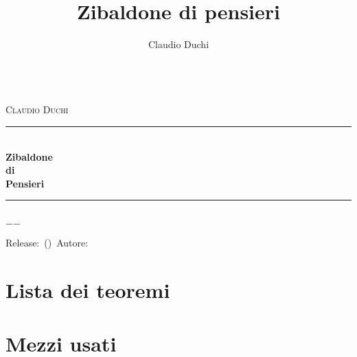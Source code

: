 \documentclass[a4paper,oneside]{book}%
\title{Zibaldone di pensieri}
\author{Claudio Duchi}
\date{\datetime}
\makeatletter
\theoremstyle{marginbreak}
\theoremstyle{marginbreak}
\theoremstyle{changebreak}
\theoremstyle{change}
\theoremstyle{change}
\theoremstyle{plain}
\theoremstyle{marginbreak}
\theoremstyle{plain}
\theoremstyle{plain}
\theoremstyle{nonumberplain}
\theoremstyle{marginbreak}
\newcommand{\HRule}{\rule{\linewidth}{0.5mm}}
\renewcommand\mainmatter{%
 	\cleardoublepage
 	\@mainmattertrue
 }
\makeatother
\begin{document}
\begin{titlepage}
\begin{center}	
	\Lgrandedue\\[1cm]    
	\textsc{\LARGE Claudio Duchi}\\[1.4cm]
	\HRule \\[0.4cm]
{ \huge \bfseries Zibaldone}\\[0.4cm]
{ \large \bfseries di}\\[0.4cm]
{ \huge \bfseries Pensieri}\\[0.4cm]
\HRule \\
\vfill
		{\large $-$\DTMnow$-$}	
\end{center}
{\centering
Release:\gitReln\ (\gitAbbrevHash)\ Autore:\gitAuthorName\ 
\gitCommitterDate \\
}
\end{titlepage}	
	\hypersetup{pageanchor=true}
		\CDcopyright
		\tableofcontents
		\chapter*{Lista dei teoremi}
		\listoffigures
			\mainmatter
			

\nocite{*}
\printbibliography
 \printindex
 \appendix
 \chapter{Mezzi usati}
 \CDMezziUsati
\end{document}
